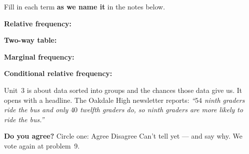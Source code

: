 \documentclass[12pt]{article}
\newcommand{\termrowheight}{2.3cm}
\newlength{\termrowinset}\setlength{\termrowinset}{7pt}
\newcommand{\vterm}[1]{%
  \par\noindent\begin{minipage}[t][\termrowheight][t]{\linewidth}%
    \vspace*{\termrowinset}%
    \textbf{\textcolor{cerulean}{#1:}}%
  \end{minipage}\par}
\begin{document}

\vspace{0.15in}

\boxguard[16]
\begin{vocabbox}
\small
Fill in each term \textbf{as we name it} in the notes below.
\vterm{Relative frequency}
\vterm{Two-way table}
\vterm{Marginal frequency}
\vterm{Conditional relative frequency}
\end{vocabbox}

\boxguard[12]
\begin{hookbox}
\small
Unit~3 is about data sorted into groups and the chances those data give us. It opens with a
headline. The Oakdale High newsletter reports: \emph{``$54$ ninth graders ride the bus and only
$40$ twelfth graders do, so ninth graders are more likely to ride the bus.''}

\vspace{3pt}
\textbf{Do you agree?} Circle one: \quad Agree \qquad Disagree \qquad Can't tell yet \quad ---
and say why. We vote again at problem~9.
\par{}
\end{hookbox}
\end{document}
